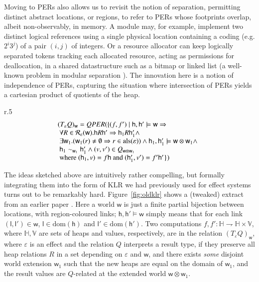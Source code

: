 \documentclass[orivec]{llncs}
\newcommand{\dom}[1]{\mathrm{dom}({#1})}
\newcommand{\eff}{\varepsilon}
\newcommand{\Stores}{\ensuremath{\mathbb{H}}}
\newcommand{\cloc}{\ensuremath{\mathsf{l}}\xspace}
\newcommand\w{\ensuremath{\mathsf{w}}\xspace}
\newcommand\heap{\ensuremath{\mathsf{h}}\xspace}
\newcommand{\Values}{\mathbb{V}}
\begin{document}
Moving to PERs also allows us to revisit the notion of separation,
permitting distinct abstract locations, or regions, to refer to PERs
whose footprints overlap, albeit non-observably, in memory. A module
may, for example, implement two distinct logical references using a
single physical location containing a coding (e.g. $2^i3^j$) of a pair
$(i,j)$ of integers. Or a resource allocator can keep logically
separated tokens tracking each allocated resource, acting as
permissions for deallocation, in a shared datastructure such as a
bitmap or linked list (a well-known problem in modular separation
\cite{krishnaswami:superficially}). The innovation here is a notion of independence of PERs,
capturing the situation where intersection of PERs yields a cartesian
product of quotients of the heap.

\begin{wrapfigure}{r}{.5\textwidth}
\vspace{-3mm}
\[\begin{array}{@{}l}
(T_\varepsilon Q)_\w = QPER(\{(f,f')\mid \heap,\heap'\models\w\Rightarrow\\
\ \forall R\in{\cal R}_\varepsilon(\w). \heap R \heap' \Rightarrow \heap_1 R \heap'_1 \wedge\\
\ \exists \w_1. (\w_1(r)\not= \emptyset\Rightarrow r\in \mathrm{als}(\varepsilon))\wedge  \heap_1,\heap_1'\models \w\otimes\w_1 \wedge\\
\ \heap_1 \sim_{\w_1} \heap'_1 \wedge (v,v')\in Q_{\w\otimes\w_1}\\
\ \mbox{where $(\heap_1,v)=f \heap$ and $(\heap'_1,v')= f' \heap'$\})}
\end{array}
\vspace{-2mm}
\]
\vspace{-2mm}
\caption{Earlier Kripke logical relation, extract}
\label{fig:oldklr}
\vspace{-9mm}
\end{wrapfigure}
The ideas sketched above are intuitively rather compelling, but
formally integrating them into the form of KLR we had previously used
for effect systems turns out to be remarkably
hard. Figure~\ref{fig:oldklr} shows a (tweaked) extract from an earlier
paper \cite{DBLP:conf/ppdp/BentonKBH07}. Here a world $\w$ is just a finite partial bijection between
locations, with region-coloured links; $\heap,\heap'\models \w$
simply means that for each link $(\cloc,\cloc')\in \w $,
$\cloc\in\dom{\heap}$
and $\cloc'\in\dom{\heap'}$.
Two
computations $f,f':\Stores \rightharpoondown
\Stores\times\Values$, where $\Stores,\Values$ are
sets of heaps and values, respectively, are in the relation
$(T_\eff Q)_\w$, where $\eff$ is an effect and the relation $Q$ interprets a
result type, if they preserve all heap relations $R$ in a set
depending on $\varepsilon$ and $\w$, and there exists \emph{some}
disjoint world extension $\w_1$ such that the new heaps are equal on
the domain of $\w_1$, and the result values are $Q$-related at the
extended world $\w\otimes \w_1$. 
\end{document}
